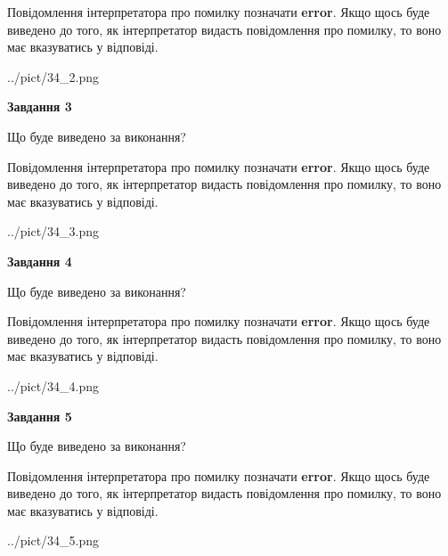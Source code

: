 \documentclass[12pt, ukrainian]{article}
\begin{document}
{\begin {large}
Повідомлення інтерпретатора про помилку позначати \textbf{error}.
Якщо щось буде виведено до того, як інтерпретатор видасть повідомлення про помилку, 
то воно має вказуватись у відповіді. \par


\begin{center}
	{../pict/34_2.png}
\end{center}
\newpage

{\begin {center}\textbf{Завдання 3}\end {center}}\par
Що буде виведено за виконання?

Повідомлення інтерпретатора про помилку позначати \textbf{error}.
Якщо щось буде виведено до того, як інтерпретатор видасть повідомлення про помилку, 
то воно має вказуватись у відповіді. \par


\begin{center}
	{../pict/34_3.png}
\end{center}
\newpage

{\begin {center}\textbf{Завдання 4}\end {center}}\par
Що буде виведено за виконання?

Повідомлення інтерпретатора про помилку позначати \textbf{error}.
Якщо щось буде виведено до того, як інтерпретатор видасть повідомлення про помилку, 
то воно має вказуватись у відповіді. \par


\begin{center}
	{../pict/34_4.png}
\end{center}
\newpage

{\begin {center}\textbf{Завдання 5}\end {center}}\par
Що буде виведено за виконання?

Повідомлення інтерпретатора про помилку позначати \textbf{error}.
Якщо щось буде виведено до того, як інтерпретатор видасть повідомлення про помилку, 
то воно має вказуватись у відповіді. \par


\begin{center}
	{../pict/34_5.png}
\end{center}
\newpage


\end{large}}
\end{document}
